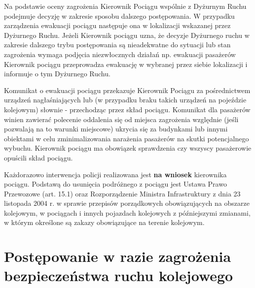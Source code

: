 Na podstawie oceny zagrożenia Kierownik Pociągu wspólnie z Dyżurnym Ruchu podejmuje decyzję w zakresie sposobu dalszego postępowania. W przypadku zarządzenia ewakuacji pociągu następuje ona w lokalizacji wskazanej przez Dyżurnego Ruchu.
Jeżeli Kierownik pociągu uzna, że decyzje Dyżurnego ruchu w zakresie dalszego trybu
postępowania są nieadekwatne do sytuacji lub stan zagrożenia wymaga podjęcia niezwłocznych działań np. ewakuacji pasażerów Kierownik pociągu przeprowadza ewakuację w wybranej przez siebie lokalizacji i informuje o tym Dyżurnego Ruchu.

Komunikat o ewakuacji pociągu przekazuje Kierownik Pociągu za pośrednictwem urządzeń
nagłaśniających lub (w przypadku braku takich urządzeń na pojeździe kolejowym) słownie - przechodząc przez skład pociągu.
Komunikat dla pasażerów winien zawierać polecenie oddalenia się od miejsca zagrożenia
względnie (jeśli pozwalają na to warunki miejscowe) ukrycia się za budynkami lub innymi obiektami w celu zminimalizowania narażenia pasażerów na skutki potencjalnego wybuchu. Kierownik pociągu ma obowiązek sprawdzenia czy wszyscy pasażerowie opuścili skład pociągu.

Każdorazowo interwencja policji realizowana jest \textbf{na wniosek} kierownika pociągu. Podstawą do usunięcia podróżnego z pociągu jest Ustawa Prawo Przewozowe (art. 15.1) oraz Rozporządzenie Ministra Infrastruktury z dnia 23 listopada 2004 r. w sprawie przepisów porządkowych obowiązujących na obszarze kolejowym, w pociągach i innych pojazdach kolejowych z późniejszymi zmianami, w którym określone są zakazy obowiązujące na terenie kolejowym. 


\chapter{Postępowanie w razie zagrożenia bezpieczeństwa ruchu kolejowego}

